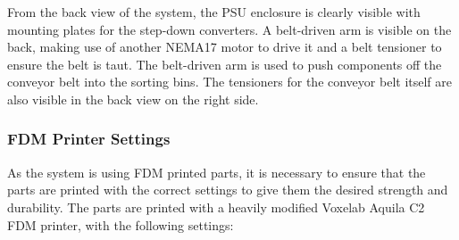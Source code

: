 From the back view of the system, the PSU enclosure is clearly visible with mounting plates for the step-down converters. A belt-driven arm is visible on the back, making use of another NEMA17 motor to drive it and a belt tensioner to ensure the belt is taut. The belt-driven arm is used to push components off the conveyor belt into the sorting bins. The tensioners for the conveyor belt itself are also visible in the back view on the right side.


\subsubsection{FDM Printer Settings}
\label{sec:3d-printer-settings}

As the system is using FDM printed parts, it is necessary to ensure that the parts are printed with the correct settings to give them the desired strength and durability. The parts are printed with a heavily modified Voxelab Aquila C2 FDM printer, with the following settings:


